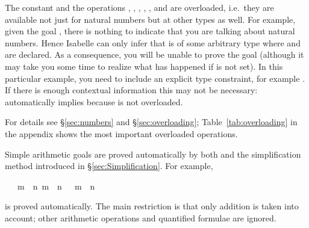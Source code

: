\begin{isabellebody}
\begin{isamarkuptext}
\begin{warn}
  The constant  and the operations
  , ,
  , ,
  ,  and
   are overloaded, i.e.\ they are available
  not just for natural numbers but at other types as well.
  For example, given the goal ,
  there is nothing to indicate that you are talking about natural numbers.
  Hence Isabelle can only infer that  is of some arbitrary type where
   and \isa{{\isacharplus}} are declared. As a consequence, you will be unable
  to prove the goal (although it may take you some time to realize what has
  happened if  is not set).  In this particular example,
  you need to include an explicit type constraint, for example
  . If there is enough contextual information this
  may not be necessary:  automatically implies
   because  is not overloaded.

  For details see \S\ref{sec:numbers} and \S\ref{sec:overloading};
  Table~\ref{tab:overloading} in the appendix shows the most important overloaded
  operations.
\end{warn}

Simple arithmetic goals are proved automatically by both  and the
simplification method introduced in \S\ref{sec:Simplification}.  For
example,%
\end{isamarkuptext}%
\ {\isachardoublequote}{\isasymlbrakk}\ {\isasymnot}\ m\ {\isacharless}\ n{\isacharsemicolon}\ m\ {\isacharless}\ n{\isacharplus}{}\ {\isasymrbrakk}\ {\isasymLongrightarrow}\ m\ {\isacharequal}\ n{\isachardoublequote}%
\begin{isamarkuptext}%
\noindent
is proved automatically. The main restriction is that only addition is taken
into account; other arithmetic operations and quantified formulae are ignored.


\end{isamarkuptext}
\end{isabellebody}
